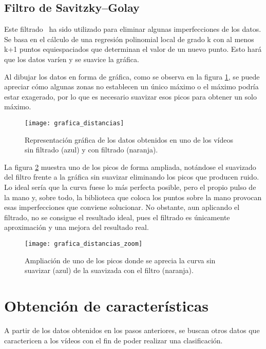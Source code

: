 \subsection{Filtro de Savitzky–Golay}
Este filtrado~\cite{wiki:savgol} ha sido utilizado para eliminar algunas imperfecciones de los datos. Se basa en el cálculo de una regresión polinomial local de grado k con al menos k+1 puntos equiespaciados que determinan el valor de un nuevo punto. Esto hará que los datos varíen y se suavice la gráfica. 

Al dibujar los datos en forma de gráfica, como se observa en la figura \ref{fig:graficadistancias}, se puede apreciar cómo algunas zonas no establecen un único máximo o el máximo podría estar exagerado, por lo que es necesario suavizar esos picos para obtener un solo máximo. 

\begin{figure}[h]
	\texttt{[image: grafica\_distancias]}
	\caption{Representación gráfica de los datos obtenidos en uno de los vídeos sin filtrado (azul) y con filtrado (naranja).}
	\label{fig:graficadistancias}
\end{figure}

La figura \ref{fig:graficadistanciaszoom} muestra uno de los picos de forma ampliada, notándose el suavizado del filtro frente a la gráfica sin suavizar eliminando los picos que producen ruido. Lo ideal sería que la curva fuese lo más perfecta posible, pero el propio pulso de la mano y, sobre todo, la biblioteca que coloca los puntos sobre la mano provocan esas imperfecciones que conviene solucionar. No obstante, aun aplicando el filtrado, no se consigue el resultado ideal, pues el filtrado es únicamente aproximación y una mejora del resultado real.

\begin{figure}[h]
	\texttt{[image: grafica\_distancias\_zoom]}
	\caption{Ampliación de uno de los picos donde se aprecia la curva sin suavizar (azul) de la suavizada con el filtro (naranja).}
	\label{fig:graficadistanciaszoom}
\end{figure}

\section{Obtención de características}
A partir de los datos obtenidos en los pasos anteriores, se buscan otros datos que caractericen a los vídeos con el fin de poder realizar una clasificación.

